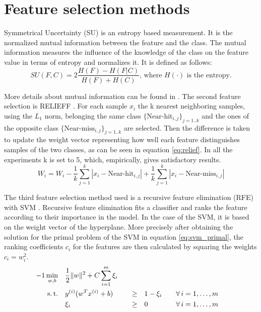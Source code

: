 \documentclass[twoside,11pt]{article}
\begin{document}
\section{Feature selection methods}

Symmetrical Uncertainty (SU) \citep{press1996numerical} is an entropy based measurement. It is the normalized mutual information between the feature and the class. The mutual information measures the influence of the knowledge of the class on the feature value in terms of entropy and normalizes it. It is defined as follows:
\begin{equation}
  \label{eq:su}
  SU(F,C) = 2 \frac{H(F) - H(F|C)}{H(F) + H(C)} \textrm{, where } H(\cdot) \textrm{ is the entropy.}
\end{equation}

More details about mutual information can be found in \cite{paninski2003estimation}. The second feature selection is RELIEFF \citep{kononenko1997overcoming}. For each sample $x_i$ the k nearest neighboring samples, using the $L_1$ norm, belonging the same class $\{\textrm{Near-hit}_{i, j}\}_{j=1..k}$ and the ones of the opposite class $\{\textrm{Near-miss}_{i, j}\}_{j=1..k}$ are selected. Then the difference is taken to update the weight vector representing how well each feature distinguishes samples of the two classes, as can be seen in equation \ref{eq:relief}. In all the experiments k is set to 5, which, empirically, gives satisfactory results.
\begin{equation}
  \label{eq:relief}
  W_i = W_i - \frac{1}{k}\sum_{j=1}^{k}|x_i - \textrm{Near-hit}_{i,j}| + \frac{1}{k}\sum_{j=1}^{k} |x_i - \textrm{Near-miss}_{i,j}|
\end{equation}

The third feature selection method used is a recursive feature elimination (RFE) with SVM \citep{guyon2002gene}. Recursive feature elimination fits a classifier and ranks the feature according to their importance in the model. In the case of the SVM, it is based on the weight vector of the hyperplane. More precisely after obtaining the solution for the primal problem of the SVM in equation \ref{eq:svm_primal}, the ranking coefficients $c_i$ for the features are then calculated by squaring the weights $c_i = w_i^2$.
\begin{alignat}{-1}
     \min_{w,b}  & \quad \frac12\|w\|^2 + C\sum_{i=1}^m \xi_i & & & \label{eq:svm_primal} \\ 
   \text{s.\,t.} & \quad y^{(i)} (w^Tx^{(i)} + b) & \quad \geq & \quad 1 -\xi_i &&
                   \quad \forall \, i = 1, \ldots, m \nonumber \\
                 & \quad \xi_i                  & \quad \geq & \quad 0 &&
                   \quad \forall \, i = 1, \ldots, m \nonumber 
\end{alignat}
\end{document}
